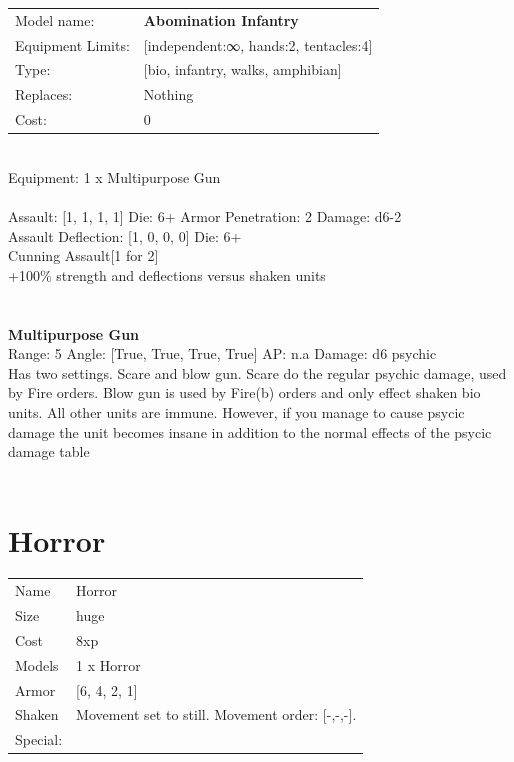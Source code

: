 \noindent
\begin{tabular}{ll}
Model name: &{\bf Abomination Infantry } \\
Equipment Limits: &[independent:∞, hands:2, tentacles:4] \\
Type: &[bio, infantry, walks, amphibian] \\
Replaces: &Nothing \\
Cost: & 0\\
\end{tabular}
\ \\
Equipment: 1 x Multipurpose Gun \\
\ \\
Assault: [1, 1, 1, 1] Die: 6+ Armor Penetration: 2 Damage: d6-2 \\
Assault Deflection: [1, 0, 0, 0] Die: 6+\\
\indent Cunning Assault[1 for 2]\\ 
+100\% strength and deflections versus shaken units\\ 
 
\ \\

\ \\
{\bf Multipurpose Gun } \\



Range: 5  Angle: [True, True, True, True] AP: n.a Damage: d6 psychic \\
Has two settings. Scare and blow gun. Scare do the regular psychic damage, used by Fire orders. Blow gun is used by Fire(b) orders and only effect shaken bio units. All other units are immune. However, if you manage to cause psycic damage the unit becomes insane in addition to the normal effects of the psycic damage table\\ 




 
\ \\













\clearpage

\section{ Horror }

\begin{tabular}{ll}
  Name & Horror \\
  Size & huge\\
  Cost & 8xp\\
  Models & 1 x Horror\\
  Armor & [6, 4, 2, 1]\\
  Shaken & Movement set to still. Movement order: [-,-,-]. \\
  Special: \\
\end{tabular}

